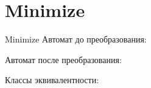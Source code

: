 \section{Minimize}
\begin{frame}{Minimize}
	Автомат до преобразования:


	Автомат после преобразования:


	Классы эквивалентности:




\end{frame}
